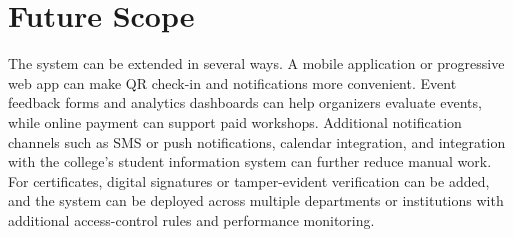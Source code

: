 \documentclass[12pt,a4paper]{report}
\begin{document}
\section{Future Scope}
The system can be extended in several ways. A mobile application or progressive web app can make QR check-in and notifications more convenient. Event feedback forms and analytics dashboards can help organizers evaluate events, while online payment can support paid workshops. Additional notification channels such as SMS or push notifications, calendar integration, and integration with the college's student information system can further reduce manual work. For certificates, digital signatures or tamper-evident verification can be added, and the system can be deployed across multiple departments or institutions with additional access-control rules and performance monitoring.
\end{document}
